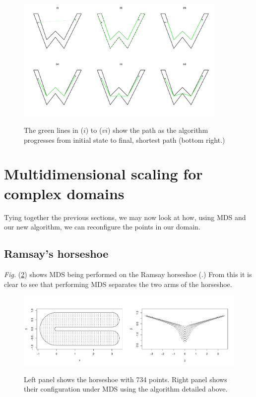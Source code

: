 \documentclass[a4paper,10pt]{article}
\newcommand{\Fig}[1]{\emph{Fig.} (\ref{#1})}
\begin{document}
\begin{figure}
\centering
\includegraphics[trim=0in 0.5in 0in 0.25in, width=4in]{figs/wdia.pdf} \\
\caption{The green lines in ($i$) to ($vi$) show the path as the algorithm progresses from initial state to final, shortest path (bottom right.) }
\label{wdia}
\end{figure}


\section{Multidimensional scaling for complex domains}

Tying together the previous sections, we may now look at how, using MDS and our new algorithm, we can reconfigure the points in our domain.

\subsection{Ramsay's horseshoe}

\Fig{ramsay-mds} shows MDS being performed on the Ramsay horseshoe (\cite{ramsay}.) From this it is clear to see that performing MDS separates the two arms of the horseshoe.

\begin{figure}
\centering
\includegraphics[trim=0in 0.5in 0in 0.25in, width=5.5in]{figs/ramsay-mds.pdf} \\
\caption{Left panel shows the horseshoe with 734 points. Right panel shows their configuration under MDS using the algorithm detailed above.}
\label{ramsay-mds}
\end{figure}
\end{document}
